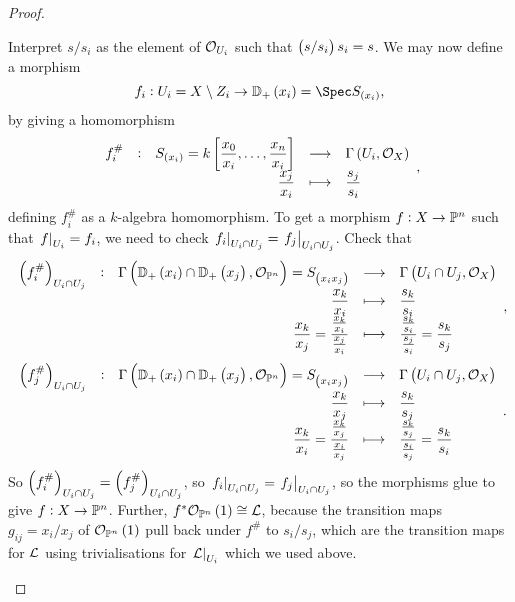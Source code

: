 \begin{proof}
\begin{itemize}
Interpret $ s / s_i $ as the element of $ \mathcal{O}_{U_i} $ such that $ \br{s / s_i}s_i = s $. We may now define a morphism
$$ f_i : U_i = X \setminus Z_i \to \DD_+\br{x_i} = \Spec S_{\br{x_i}}, $$
by giving a homomorphism
$$ \function[f_i^\#]{S_{\br{x_i}} = k\sbr{\dfrac{x_0}{x_i}, \dots, \dfrac{x_n}{x_i}}}{\Gamma\br{U_i, \OOO_X}}{\dfrac{x_j}{x_i}}{\dfrac{s_j}{s_i}}, $$
defining $ f_i^\# $ as a $ k $-algebra homomorphism. To get a morphism $ f : X \to \mathbb{P}^n $ such that $ \left. f \right|_{U_i} = f_i $, we need to check $ \left. f_i \right|_{U_i \cap U_j} = \left. f_j \right|_{U_i \cap U_j} $. Check that
$$ \functions[\br{f_i^\#}_{U_i \cap U_j}]{\Gamma\br{\DD_+\br{x_i} \cap \DD_+\br{x_j}, \OOO_{\PP^n}} = S_{\br{x_ix_j}}}{\Gamma\br{U_i \cap U_j, \OOO_X}}{\dfrac{x_k}{x_i}}{\dfrac{s_k}{s_i}}{\dfrac{x_k}{x_j} = \dfrac{\tfrac{x_k}{x_i}}{\tfrac{x_j}{x_i}}}{\dfrac{\tfrac{s_k}{s_i}}{\tfrac{s_j}{s_i}} = \dfrac{s_k}{s_j}}, $$
$$ \functions[\br{f_j^\#}_{U_i \cap U_j}]{\Gamma\br{\DD_+\br{x_i} \cap \DD_+\br{x_j}, \OOO_{\PP^n}} = S_{\br{x_ix_j}}}{\Gamma\br{U_i \cap U_j, \OOO_X}}{\dfrac{x_k}{x_j}}{\dfrac{s_k}{s_j}}{\dfrac{x_k}{x_i} = \dfrac{\tfrac{x_k}{x_j}}{\tfrac{x_i}{x_j}}}{\dfrac{\tfrac{s_k}{s_j}}{\tfrac{s_i}{s_j}} = \dfrac{s_k}{s_i}}. $$
So $ \br{f_i^\#}_{U_i \cap U_j} = \br{f_j^\#}_{U_i \cap U_j} $, so $ \left. f_i \right|_{U_i \cap U_j} = \left. f_j \right|_{U_i \cap U_j} $, so the morphisms glue to give $ f : X \to \mathbb{P}^n $. Further, $ f^*\OOO_{\PP^n}\br{1} \cong \LLL $, because the transition maps $ g_{ij} = x_i / x_j $ of $ \OOO_{\PP^n}\br{1} $ pull back under $ f^\# $ to $ s_i / s_j $, which are the transition maps for $ \mathcal{L} $ using trivialisations for $ \left. \mathcal{L} \right|_{U_i} $ which we used above.

\pagebreak


\end{itemize}
\end{proof}
